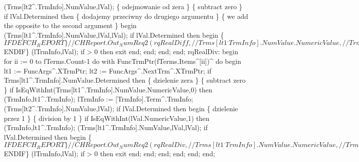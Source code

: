                            (Trms[lt2^.TrmInfo].NumValue,lVal);
                           \{ odejmowanie od zera \} \{ subtract zero \}
                           if lVal.Determined then
                              \{ dodajemy przeciwny do drugiego argumentu \}
                              \{ we add the opposite to the second argument \}
                           begin (Trms[lt1^.TrmInfo].NumValue,lVal,lVal);
                           if lVal.Determined then
                           begin
\{$IFDEF CH_REPORT\}
//                CHReport.Out_NumReq2(rqRealDiff,
//                                    Trms[lt1^.TrmInfo].NumValue.NumericValue,
//                                     Trms[lt2^.TrmInfo].NumValue.NumericValue);
\{$ENDIF\}
                              (lTrmInfo,lVal);
                              if  > 0 then exit
                           end;
                           end;
                        end;
                     end;
                  rqRealDiv:
                     begin
                        for ii := 0 to fTerms.Count-1 do
                           with FuncTrmPtr(fTerms.Items^[ii])^ do
                        begin lt1 := FuncArgs^.XTrmPtr;
                        lt2 := FuncArgs^.NextTrm^.XTrmPtr;
                        if Trms[lt1^.TrmInfo].NumValue.Determined then
                           \{ dzielenie zera \} \{ subtract zero \}
                           if IsEqWithInt(Trms[lt1^.TrmInfo].NumValue.NumericValue,0) then
                              (TrmInfo,lt1^.TrmInfo);
                        lTrmInfo := [TrmInfo].Term^.TrmInfo;
                        (Trms[lt2^.TrmInfo].NumValue,lVal);
                        if lVal.Determined then
                        begin
                           \{ dzielenie przez 1 \} \{ division by 1 \}
                           if IsEqWithInt(lVal.NumericValue,1) then
                              (TrmInfo,lt1^.TrmInfo);
                           (Trms[lt1^.TrmInfo].NumValue,lVal,lVal);
                           if lVal.Determined then
                           begin
\{$IFDEF CH_REPORT\}
//                 CHReport.Out_NumReq2(rqRealDiv,
//                                      Trms[lt1^.TrmInfo].NumValue.NumericValue,
//                                      Trms[lt2^.TrmInfo].NumValue.NumericValue);
\{$ENDIF\}
                              (lTrmInfo,lVal);
                              if  > 0 then exit
                           end;
                        end;
                        end;
                     end;
               end;
         end;
      
